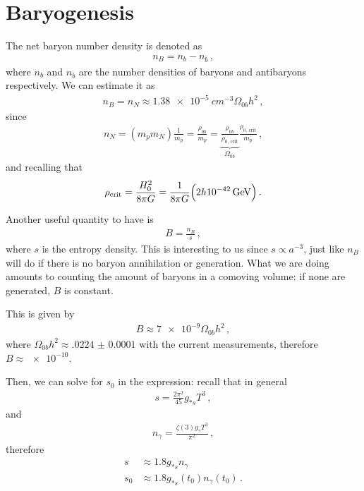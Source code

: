 \documentclass[main.tex]{subfiles}
\begin{document}
\chapter{Baryogenesis}


The net baryon number density is denoted as 
%
\begin{align}
n_B = n_b - n_{\overline{b}}
\,,
\end{align}
%
where \(n_b\) and \(n_{\overline{b}}\) are the number densities of baryons and antibaryons respectively. 
We can estimate it as 
%
\begin{align}
n_B = n_N \approx \SI{1.38e-5}{cm^{-3}} \Omega_{0b} h^2
\,,
\end{align}
%
since
%
\begin{align}
n_N = (m_p m_N) \frac{1}{m_p} = \frac{\rho_{0b}}{m_p} 
= \underbrace{\frac{\rho_{0b}}{\rho _{\text{0, crit}}}}_{\Omega_{0b}} \frac{\rho _{\text{0, crit}}}{m_p}
\,,
\end{align}
%
and recalling that 
%
\begin{align}
\rho _{\text{crit}} = \frac{H_0^2}{8 \pi G} = \frac{1}{8 \pi G} \qty(2 h \SI{e-42}{GeV} ) 
\,.
\end{align}

Another useful quantity to have is 
%
\begin{align}
B = \frac{n_B}{s}
\,,
\end{align}
%
where \(s\) is the entropy density.
This is interesting to us since \(s \propto a^{-3}\), just like \(n_B\) will do if there is no baryon annihilation or generation. 
What we are doing amounts to counting the amount of baryons in a comoving volume: if none are generated, \(B\) is constant. 

This is given by 
%
\begin{align}
B \approx \num{7e-9} \Omega_{0b} h^2
\,,
\end{align}
%
where \(\Omega_{0b} h^2 \approx \num{.0224(1)}\) with the current measurements, therefore \(B \approx \num{e-10}\).
    
Then, we can solve for \(s_0 \) in the expression: recall that in general
%
\begin{align}
s = \frac{2 \pi^2}{45} g_{*s} T^3
\,,
\end{align}
%
and 
%
\begin{align}
n_\gamma = \frac{\zeta (3) g_\gamma T^3}{\pi^2}
\,,
\end{align}
%
therefore 
%
\begin{align}
s &\approx \num{1.8} g_{*s} n_\gamma  \\
s_0 &\approx \num{1.8} g_{*s}(t_0 ) n_\gamma (t_0 )
\,.
\end{align}
\end{document}
